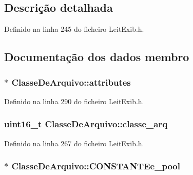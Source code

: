 \subsection{Descrição detalhada}


Definido na linha 245 do ficheiro Leit\-Exib.\-h.



\subsection{Documentação dos dados membro}
\hypertarget{struct_classe_de_arquivo_a9119e38492ee3cba2075867129584f66}{
\subsubsection[{attributes}]{$\ast$ Classe\-De\-Arquivo\-::attributes}}\label{struct_classe_de_arquivo_a9119e38492ee3cba2075867129584f66}


Definido na linha 290 do ficheiro Leit\-Exib.\-h.

\hypertarget{struct_classe_de_arquivo_ace786690df6e3ea741a18e3b49102e2b}{
\subsubsection[{classe\-\_\-arq}]{\setlength{\rightskip}{0pt plus 5cm}uint16\-\_\-t Classe\-De\-Arquivo\-::classe\-\_\-arq}}\label{struct_classe_de_arquivo_ace786690df6e3ea741a18e3b49102e2b}


Definido na linha 267 do ficheiro Leit\-Exib.\-h.

\hypertarget{struct_classe_de_arquivo_a41c0d5758a7188709f83876e9577e134}{
\subsubsection[{C\-O\-N\-S\-T\-A\-N\-T\-Ee\-\_\-pool}]{$\ast$ Classe\-De\-Arquivo\-::\-C\-O\-N\-S\-T\-A\-N\-T\-Ee\-\_\-pool}}\label{struct_classe_de_arquivo_a41c0d5758a7188709f83876e9577e134}


